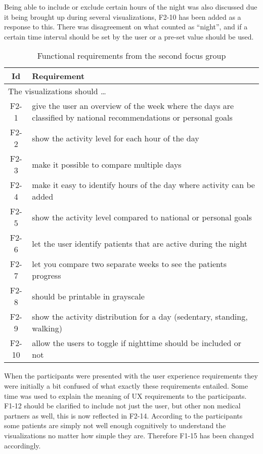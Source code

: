 Being able to include or exclude certain hours of the night was also discussed due it being brought up during several visualizations, F2-10 has been added as a response to this. There was disagreement on what counted as ``night'', and if a certain time interval should be set by the user or a pre-set value should be used. 

\begin{table}[h!]
  \begin{center}
  \begin{tabular}{|c|p{12cm}|}
    \hline
      \textbf{Id} & \textbf{Requirement} \\ \hline
    \multicolumn{2}{|l|}{The visualizations should \ldots} \\ \hline
      F2-1 & give the user an overview of the week where the days are classified by national recommendations or personal goals \\ \hline
      F2-2 & show the activity level for each hour of the day \\ \hline
      F2-3 & make it possible to compare multiple days \\ \hline
      F2-4 & make it easy to identify hours of the day where activity can be added \\ \hline
      F2-5 & show the activity level compared to national or personal goals \\ \hline
      F2-6 & let the user identify patients that are active during the night \\ \hline
      F2-7 & let you compare two separate weeks to see the patients progress \\ \hline
      F2-8 & should be printable in grayscale \\ \hline
      F2-9 & show the activity distribution for a day (sedentary, standing, walking) \\ \hline
      F2-10 & allow the users to toggle if nighttime should be included or not \\ \hline
  \end{tabular}
  \end{center}
  \caption{Functional requirements from the second focus group}
\end{table}

When the participants were presented with the user experience requirements they were initially a bit confused of what exactly these requirements entailed. Some time was used to explain the meaning of UX requirements to the participants. F1-12 should be clarified to include not just the user, but other non medical partners as well, this is now reflected in F2-14. According to the participants some patients are simply not well enough cognitively to understand the visualizations no matter how simple they are. Therefore F1-15 has been changed accordingly.

